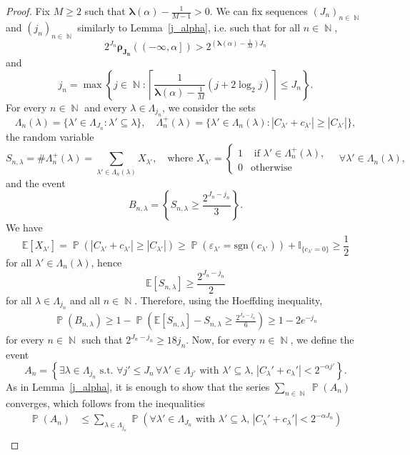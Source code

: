 \documentclass[a4paper,11pt,oneside]{article}
\DeclareMathOperator{\N}{\mathbb{N}}
\DeclareMathOperator{\prob}{\mathbb{P}}
\newcommand{\ocint}[1]{\left({#1}\right]}
\newcommand{\modu}[1]{\left\vert{#1}\right\vert}
\theoremstyle{definition}
\theoremstyle{plain}
\begin{document}
\begin{proof}
Fix $M\geq 2$ such that $\bm{\lambda}(\alpha)-\frac{1}{M-1}>0$. We can fix sequences $(J_n)_{n\in\N}$ and $(j_n)_{n\in\N}$ similarly to Lemma~\ref{j_alpha}, i.e. such that for all $n\in\N$,
\[
2^{J_n}\bm{\rho_{J_n}}(\ocint{-\infty,\alpha})>2^{\left(\bm{\lambda}(\alpha)-\frac{1}{M}\right)J_n}
\]
and 
\[
j_n=\max\left\{j\in\N:\left\lceil\frac{1}{\bm{\lambda}(\alpha)-\frac{1}{M}}(j+2\log_2j)\right\rceil\leq J_n\right\}.
\]
For every $n\in\N$ and every $\lambda\in\Lambda_{j_n}$, we consider the sets
\[
\Lambda_n(\lambda)=\{\lambda'\in\Lambda_{J_n}:\lambda'\subseteq\lambda\},\quad\Lambda_n^+(\lambda)=\{\lambda'\in\Lambda_n(\lambda):\modu{C_{\lambda'}+c_{\lambda'}}\geq\modu{C_{\lambda'}}\},
\]
the random variable
\[
S_{n,\lambda}=\#\Lambda_n^+(\lambda)=\sum_{\lambda'\in\Lambda_n(\lambda)}X_{\lambda'}, \quad\text{where }X_{\lambda'}=\left\{\begin{array}{ll}
1 & \text{ if } \lambda'\in\Lambda_n^+(\lambda), \\
0 & \text{otherwise}
\end{array}\right.\quad\forall\lambda'\in\Lambda_n(\lambda),
\]
and the event
\[
B_{n,\lambda}=\left\{S_{n,\lambda}\geq \frac{2^{J_n-j_n}}{3}\right\}.
\]
We have
\[
\mathbb{E}[X_{\lambda'}]=\prob\left(\modu{C_{\lambda'}+c_{\lambda'}}\geq \modu{C_{\lambda'}}\right)\geq\prob(\varepsilon_{\lambda'}=\text{sgn}(c_{\lambda'}))+\mathbb{I}_{\{c_{\lambda'}=0\}}\geq\frac{1}{2}
\]
for all $\lambda'\in\Lambda_n(\lambda)$, hence
\[
\mathbb{E}[S_{n,\lambda}]\geq\frac{2^{J_n-j_n}}{2}
\]
for all $\lambda\in\Lambda_{j_n}$ and all $n\in\N$. Therefore, using the Hoeffding inequality,
\begin{align*}
\prob(B_{n,\lambda})\geq 1-\prob\left(\mathbb{E}[S_{n,\lambda}]-S_{n,\lambda}\geq \frac{2^{J_n-j_n}}{6}\right) \geq 1-2e^{-j_n}
\end{align*}
for every $n\in\N$ such that $2^{J_n-j_n}\geq 18j_n$. Now, for every $n\in\N$, we define the event
\[
A_n=\left\{\exists\lambda\in\Lambda_{j_n}\text{ s.t. }\forall j'\leq J_n\,\forall\lambda'\in\Lambda_{j'}\text{ with }\lambda'\subseteq \lambda,\, \modu{C_\lambda'+c_\lambda'}<2^{-\alpha j'}\right\}.
\]
As in Lemma~\ref{j_alpha}, it is enough to show that the series $\sum_{n\in\N}\prob(A_n)$ converges, which follows from the inequalities
\begin{align*}
\prob(A_n) 
& \leq \sum_{\lambda\in\Lambda_{j_n}}\prob\left(\forall \lambda'\in\Lambda_{J_n}\text{ with }\lambda'\subseteq\lambda,\,\modu{C_\lambda'+c_\lambda'}<2^{-\alpha J_n}\right) \\

\end{align*}
\end{proof}
\end{document}
